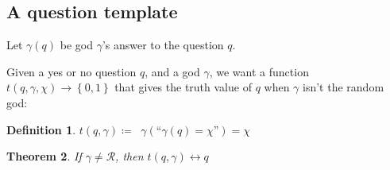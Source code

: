 \documentclass[twoside,twocolumn,a4paper,11pt]{article}
\newtheorem{theorem}{Theorem}[section]
\theoremstyle{definition}
\newtheorem{defn}[theorem]{Definition}
\begin{document}
\subsection{A question template}
Let $\gamma(q)$ be 
god $\gamma$'s answer to the question $q$.

Given a yes or no question $q$,
and a god $\gamma$,
we want a function $t(q,\gamma,\chi) \rightarrow\left\lbrace 0,1\right\rbrace$ that gives 
the truth value of $q$
when $\gamma$ isn't the random god:
%
\begin{defn}
\label{def:t}
\(
t(q,\gamma)\coloneqq\;\;
 \gamma( \mbox{``}\gamma(q)=\chi\mbox{''}) = \chi 
\)
\end{defn}
\begin{theorem}
\label{theorem:templateWorks}
If $\gamma\neq\mathcal{R}$, then $t(q,\gamma)\leftrightarrow q$ 
\end{theorem}
\vspace{-0.95em}
\end{document}
